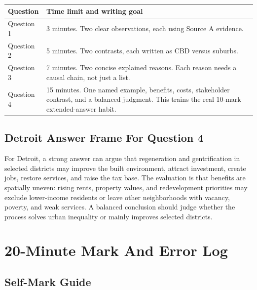 \documentclass[11pt,a4paper]{article}
\begin{document}
\begin{tabularx}{\textwidth}{L{0.2\textwidth}Y}
\toprule
\textbf{Question} & \textbf{Time limit and writing goal} \\
\midrule
Question 1 & 3 minutes. Two clear observations, each using Source A evidence. \\
Question 2 & 5 minutes. Two contrasts, each written as CBD versus suburbs. \\
Question 3 & 7 minutes. Two concise explained reasons. Each reason needs a
causal chain, not just a list. \\
Question 4 & 15 minutes. One named example, benefits, costs, stakeholder
contrast, and a balanced judgment. This trains the real 10-mark extended-answer
habit. \\
\bottomrule
\end{tabularx}

\subsection{Detroit Answer Frame For Question 4}

For Detroit, a strong answer can argue that regeneration and gentrification in
selected districts may improve the built environment, attract investment,
create jobs, restore services, and raise the tax base. The evaluation is that
benefits are spatially uneven: rising rents, property values, and redevelopment
priorities may exclude lower-income residents or leave other neighborhoods with
vacancy, poverty, and weak services. A balanced conclusion should judge whether
the process solves urban inequality or mainly improves selected districts.

\section{20-Minute Mark And Error Log}

\subsection{Self-Mark Guide}
\end{document}
